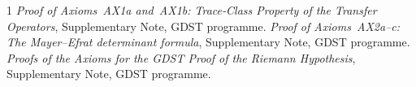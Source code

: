 \documentclass[11pt,a4paper]{article}
\theoremstyle{definition}
\begin{document}
\begin{thebibliography}{1}
 \emph{Proof of Axioms~AX1a and~AX1b: Trace‑Class Property of the Transfer Operators}, Supplementary Note, GDST programme.
 \emph{Proof of Axioms~AX2a--c: The Mayer–Efrat determinant formula}, Supplementary Note, GDST programme.
 \emph{Proofs of the Axioms for the GDST Proof of the Riemann Hypothesis}, Supplementary Note, GDST programme.
\end{thebibliography}
\end{document}
